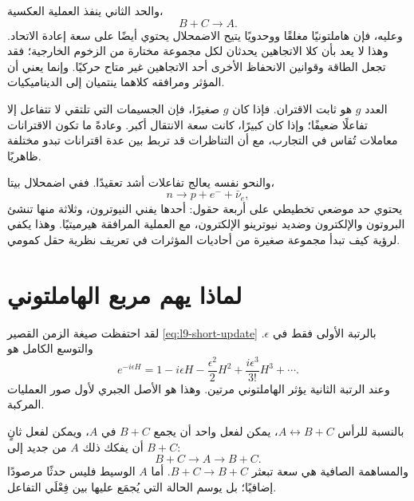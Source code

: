 والحد الثاني ينفذ العملية العكسية،
\begin{equation}
B+C\longrightarrow A.
\end{equation}
وعليه، فإن هاملتونيًا مغلقًا ووحدويًا يتيح الاضمحلال يحتوي أيضًا على سعة إعادة الاتحاد. وهذا لا يعد بأن كلا الاتجاهين يحدثان لكل مجموعة مختارة من الزخوم الخارجية؛ فقد تجعل الطاقة وقوانين الانحفاظ الأخرى أحد الاتجاهين غير متاح حركيًا. وإنما يعني أن المؤثر ومرافقه كلاهما ينتميان إلى الديناميكيات.

\begin{classroomqa}
\end{classroomqa}

العدد \(g\) هو ثابت الاقتران. فإذا كان \(g\) صغيرًا، فإن الجسيمات التي تلتقي لا تتفاعل إلا تفاعلًا ضعيفًا؛ وإذا كان كبيرًا، كانت سعة الانتقال أكبر. وعادةً ما تكون الاقترانات معاملات تُقاس في التجارب، مع أن التناظرات قد تربط بين عدة اقترانات تبدو مختلفة ظاهريًا.

والنحو نفسه يعالج تفاعلات أشد تعقيدًا. ففي اضمحلال بيتا،
\begin{equation}
n\longrightarrow p+e^-+\bar\nu_e,
\end{equation}
يحتوي حد موضعي تخطيطي على أربعة حقول: أحدها يفني النيوترون، وثلاثة منها تنشئ البروتون والإلكترون وضديد نيوترينو الإلكترون، مع العملية المرافقة هيرميتيًا. وهذا يكفي لرؤية كيف تبدأ مجموعة صغيرة من أحاديات المؤثرات في تعريف نظرية حقل كمومي.

\section{لماذا يهم مربع الهاملتوني}

لقد احتفظت صيغة الزمن القصير \eqref{eq:l9-short-update} بالرتبة الأولى فقط في \(\epsilon\). والتوسع الكامل هو
\begin{equation}
e^{-i\epsilon H}
=1-i\epsilon H-\frac{\epsilon^2}{2}H^2
+\frac{i\epsilon^3}{3!}H^3+\cdots.
\label{eq:l9-exponential}
\end{equation}
وعند الرتبة الثانية يؤثر الهاملتوني مرتين. وهذا هو الأصل الجبري لأول صور العمليات المركبة.

بالنسبة للرأس \(A\leftrightarrow B+C\)، يمكن لفعل واحد أن يجمع \(B+C\) في \(A\)، ويمكن لفعل ثانٍ أن يفكك ذلك \(A\) من جديد إلى \(B+C\):
\begin{equation}
B+C\longrightarrow A\longrightarrow B+C.
\label{eq:l9-bc-scattering}
\end{equation}
والمساهمة الصافية هي سعة تبعثر \(B+C\to B+C\). أما \(A\) الوسيط فليس حدثًا مرصودًا إضافيًا؛ بل يوسم الحالة التي يُجمَع عليها بين فِعْلَي التفاعل.

